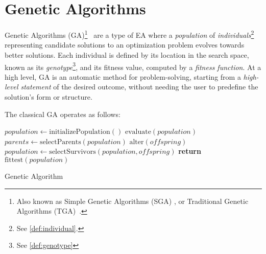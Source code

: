 \section{Genetic Algorithms}
\label{sec:genetic_algorithms}
  Genetic Algorithms (GA)\footnote{
    Also known as Simple Genetic Algorithms (SGA) 
    \autocite{yuIntroductionEvolutionaryAlgorithms2010}, or Traditional 
    Genetic Algorithms (TGA)~\autocite{shiffmanNatureCode2012}.
  }~\autocite{hollandAdaptationNaturalArtificial1992a,kozaGeneticProgrammingProgramming1992a,yuIntroductionEvolutionaryAlgorithms2010,shiffmanNatureCode2012}
  are a type of EA where a \emph{population} of \emph{individuals}\footnote{
    See \vref{def:individual}.
  } representing candidate solutions to an optimization problem evolves towards better solutions.
  Each individual is defined by its location in the search space, known as its
  \emph{genotype}\footnote{See \vref{def:genotype}}, and its fitness value, computed by a \emph{fitness function}.
  At a high level, GA is an automatic method for problem-solving, starting from a 
  \textit{high-level statement} of the desired outcome, without needing the user to predefine
  the solution's form or structure.

  The classical GA operates as follows:

  \begin{algorithm}
    \begin{algorithmic}[1]
      \State \(\mathit{population} \gets \mathrm{initializePopulation()}\) 
      \State \(\mathrm{evaluate}(\mathit{population})\) 
      \Repeat
        \State \(\mathit{parents} \gets \mathrm{selectParents}(\mathit{population})\) 
        \State \(\mathrm{alter}(\mathit{offspring})\) 
        \State \(\mathit{population} \gets \mathrm{selectSurvivors}(\mathit{population},
          \mathit{offspring})\) 
       
      \State \textbf{return} \(\mathrm{fittest}(\mathit{population})\) 
    \end{algorithmic}
    \caption{Genetic Algorithm}
    \label{alg:genetic_algorithm}
  \end{algorithm}

